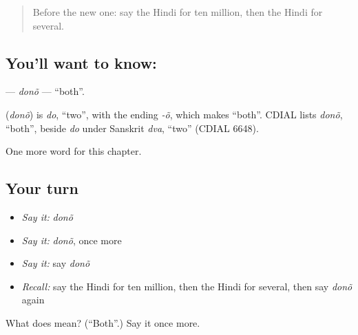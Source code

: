 \label{lesson:HI-C244-dono}



\begin{quote}
Before the new one: say the Hindi for ten million, then the Hindi for several.
\end{quote}

\subsection*{You'll want to know: }
\textbf{} — \emph{donõ} — \textquotedblleft{}both\textquotedblright{}.

\begin{cousinweb}
\textbf{} (\emph{donõ}) is \emph{do}, \textquotedblleft{}two\textquotedblright{}, with the ending \emph{-õ}, which makes \textquotedblleft{}both\textquotedblright{}. CDIAL lists \emph{donõ}, \textquotedblleft{}both\textquotedblright{}, beside \emph{do} under Sanskrit \emph{dva}, \textquotedblleft{}two\textquotedblright{} (CDIAL 6648).
\end{cousinweb}

\begin{grammarlens}[title={What you've built}]
One more word for this chapter.
\end{grammarlens}

\subsection*{Your turn}
\begin{itemize}
\raggedright
  \item \emph{Say it:} \emph{donõ}
  \item \emph{Say it:} \emph{donõ}, once more
  \item \emph{Say it:} say \emph{donõ}
  \item \emph{Recall:} say the Hindi for ten million, then the Hindi for several, then say \emph{donõ} again
\end{itemize}

\begin{tcolorbox}[breakable,colback=teal!4,colframe=teal!35!black,title={Before you move on}]
What does  mean? (\textquotedblleft{}Both\textquotedblright{}.) Say it once more.
\end{tcolorbox}
